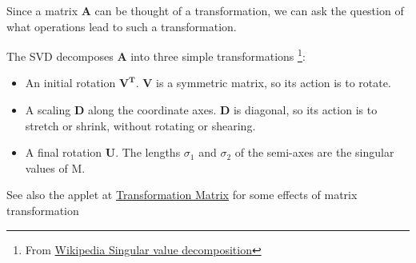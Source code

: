 Since a matrix \textbf{A} can be thought of a transformation, we can ask the question
of what operations lead to such a transformation.

The SVD decomposes \textbf{A} into three simple transformations
\footnote{From \href{http://en.wikipedia.org/wiki/Singular_value_decomposition}{Wikipedia Singular value decomposition}}:

\begin{itemize}
    \item An initial rotation $\mathbf{V^T}$. \textbf{V} is a symmetric matrix, so its action is to rotate.
    \item A scaling \textbf{D} along the coordinate axes. \textbf{D} is diagonal, so its action is to stretch or shrink, without rotating or shearing.
    \item A final rotation \textbf{U}. The lengths $\sigma_1$ and $\sigma_2$ of the semi-axes are the singular values of M.
\end{itemize}

See also the applet at \href{http://mathforum.org/mathimages/index.php/Transformation_Matrix}{Transformation Matrix} for some effects of matrix transformation 